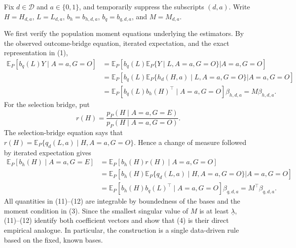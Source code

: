 Fix \(d\in\mathcal D\) and \(a\in\{0,1\}\), and temporarily suppress the subscripts \((d,a)\).  Write \(H=H_{d,a}\), \(L=L_{d,a}\), \(b_h=b_{h,d,a}\), \(b_q=b_{q,d,a}\), and \(M=M_{d,a}\).

We first verify the population moment equations underlying the estimators.  By the observed outcome-bridge equation, iterated expectation, and the exact representation in (1),
\[
\begin{aligned}
 \mathbb E_P\!\left[b_q(L)Y\mid A=a,G=O\right]
 &=\mathbb E_P\!\left[
 b_q(L)\mathbb E_P\{Y\mid L,A=a,G=O\}
 \mathrel{\Big|}A=a,G=O\right]\\
 &=\mathbb E_P\!\left[
 b_q(L)\mathbb E_P\{h_d(H,a)\mid L,A=a,G=O\}
 \mathrel{\Big|}A=a,G=O\right]\\
 &=\mathbb E_P\!\left[b_q(L)b_h(H)^\top\mid A=a,G=O\right]
 \beta_{h,d,a}
 =M\beta_{h,d,a}.                                      \tag{11}
\end{aligned}
\]
For the selection bridge, put
\[
 r(H)=\frac{p_P(H\mid A=a,G=E)}{p_P(H\mid A=a,G=O)}.
\]
The selection-bridge equation says that
\(r(H)=\mathbb E_P\{q_d(L,a)\mid H,A=a,G=O\}\).  Hence a change of measure followed by iterated expectation gives
\[
\begin{aligned}
 \mathbb E_P\!\left[b_h(H)\mid A=a,G=E\right]
 &=\mathbb E_P\!\left[b_h(H)r(H)\mid A=a,G=O\right]\\
 &=\mathbb E_P\!\left[
 b_h(H)\mathbb E_P\{q_d(L,a)\mid H,A=a,G=O\}
 \mathrel{\Big|}A=a,G=O\right]\\
 &=\mathbb E_P\!\left[b_h(H)b_q(L)^\top\mid A=a,G=O\right]
 \beta_{q,d,a}
 =M^\top\beta_{q,d,a}.                                  \tag{12}
\end{aligned}
\]
All quantities in (11)--(12) are integrable by boundedness of the bases and the moment condition in (3).  Since the smallest singular value of \(M\) is at least \(\underline\lambda\), (11)--(12) identify both coefficient vectors and show that (4) is their direct empirical analogue.  In particular, the construction is a single data-driven rule based on the fixed, known bases.

